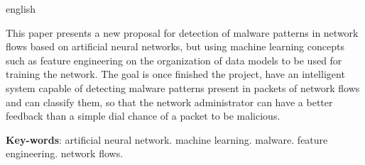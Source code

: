 \begin{resumo}[Abstract]
 \begin{otherlanguage*}{english}

   This paper presents a new proposal for detection of malware patterns in network flows based on artificial neural networks, but using machine learning concepts such as feature engineering on the organization of data models to be used for training the network. The goal is once finished the project, have an intelligent system capable of detecting malware patterns present in packets of network flows and can classify them, so that the network administrator can have a better feedback than a simple dial chance of a packet to be malicious.

   \vspace{\onelineskip}

   \noindent
   \textbf{Key-words}: artificial neural network. machine learning. malware. feature engineering. network flows.
 \end{otherlanguage*}
\end{resumo}
